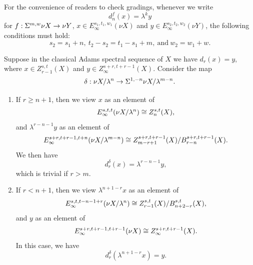 \documentclass[12pt]{amsart}
\numberwithin{equation}{section}
\begin{document}
\begin{remark}
    For the convenience of readers to check gradings, whenever we write
    $$d_{n}^{f}(x)=\lambda^k y$$
    for $f: \Sigma^{m,w} \nu X\to \nu Y$,
    $x\in E_\infty^{s_1,t_1,w_1}(\nu X)$ and
    $y\in E_\infty^{s_2,t_2,w_2}(\nu Y)$,
    the following conditions must hold:
    $$s_2=s_1+n, \ t_2-s_2=t_1-s_1+m, \ \text{and} \ w_2=w_1+w.$$
\end{remark}

\begin{proposition}\label{prop:6de7d130}
    Suppose in the classical Adams spectral sequence of $X$ we have $d_r(x)=y$, where $x\in Z_{r-1}^{s,t}(X)$ and $y\in Z_\infty^{s+r,t+r-1}(X)$. Consider the map
    $$\delta:\nu X/\lambda^n\to \Sigma^{1,-n}\nu X/\lambda^{m-n}.$$
    \begin{enumerate}
        \item If $r\ge n+1$, then we view $x$ as an element of
        $$E_\infty^{s,t,t}(\nu X/\lambda^n)\cong Z_n^{s,t}(X),$$
        and $\lambda^{r-n-1} y$ as an element of
        $$E_\infty^{s+r,t+r-1, t+n}(\nu X/\lambda^{m-n})\cong Z_{m-r+1}^{s+r,t+r-1}(X)/B_{r-n}^{s+r,t+r-1}(X).$$
        We then have
        $$d^{\delta}_r(x)=\lambda^{r-n-1}y,$$
        which is trivial if $r>m$.
        \item If $r<n+1$, then we view $\lambda^{n+1-r}x$ as an element of
        $$E_\infty^{s,t,t-n-1+r}(\nu X/\lambda^n)\cong Z^{s,t}_{r-1}(X)/B^{s,t}_{n+2-r}(X),$$
        and $y$ as an element of
        $$E_\infty^{s+r,t+r-1, t+r-1}(\nu X)\cong Z_\infty^{s+r,t+r-1}(X).$$
        In this case, we have
        $$d^{\delta}_r(\lambda^{n+1-r}x)=y.$$
    \end{enumerate}
\end{proposition}
\end{document}
